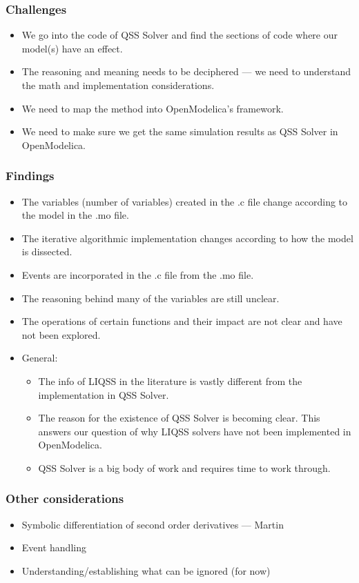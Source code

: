 \documentclass[serif,10pt,t]{beamer}
\begin{document}
 \begin{frame}\frametitle{Challenges}
\begin{itemize}
 \item We go into the code of QSS Solver and find the sections of code where our model(s) have an effect.
 \item The reasoning and meaning needs to be deciphered --- we need to understand the math and implementation considerations.
 \item We need to map the method into OpenModelica's framework.
 \item We need to make sure we get the same simulation results as QSS Solver in OpenModelica.
\end{itemize}

 \end{frame}





\begin{frame}\frametitle{Findings}
 \begin{itemize}
  \item The variables (number of variables) created in the .c file change according to the model in the .mo file.
  \item The iterative algorithmic implementation changes according to how the model is dissected.
  \item Events are incorporated in the .c file from the .mo file.
  \item The reasoning behind many of the variables are still unclear.
  \item The operations of certain functions and their impact are not clear and have not been explored.
 \end{itemize}

 \vspace{.5cm}
  \begin{itemize}
\item General:
 \begin{itemize}
  \item The info of LIQSS in the literature is vastly different from the implementation in QSS Solver.
  \item The reason for the existence of QSS Solver is becoming clear. This answers our question of why LIQSS solvers have not been implemented in OpenModelica.
  \item QSS Solver is a big body of work and requires time to work through.
 \end{itemize}
 \end{itemize}

\end{frame}



\begin{frame}\frametitle{Other considerations}
\begin{itemize}
 \item Symbolic differentiation of second order derivatives --- Martin
 \item Event handling
 \item Understanding/establishing what can be ignored (for now)
\end{itemize}


\end{frame}
\end{document}
